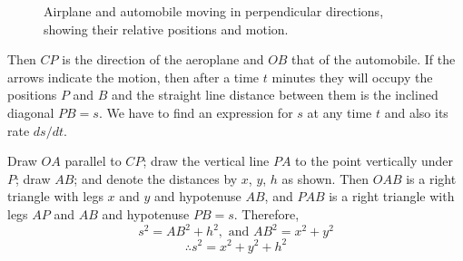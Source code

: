\begin{figure}[h]
    \centering
    \caption{Airplane and automobile moving in perpendicular directions, showing their relative positions and motion.}
    \label{fig:airplane}
\end{figure}

Then $CP$ is the direction of the aeroplane and $OB$ that of the automobile. If the arrows indicate the motion, then after a time $t$ minutes they will occupy the positions $P$ and $B$ and the straight line distance between them is the inclined diagonal $PB = s$. We have to find an expression for $s$ at any time $t$ and also its rate $ds/dt$.

Draw $OA$ parallel to $CP$; draw the vertical line $PA$ to the point vertically under $P$; draw $AB$; and denote the distances by $x$, $y$, $h$ as shown. Then $OAB$ is a right triangle with legs $x$ and $y$ and hypotenuse $AB$, and $PAB$ is a right triangle with legs $AP$ and $AB$ and hypotenuse $PB = s$. Therefore,
\[s^2 = AB^2 + h^2, \text{ and } AB^2 = x^2 + y^2\]
\[\therefore s^2 = x^2 + y^2 + h^2 \tag{a}\]

